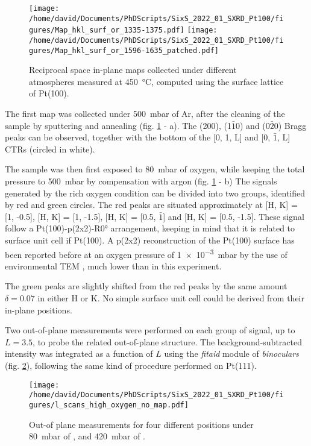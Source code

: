 \begin{figure}[!htb]
    \centering
    \texttt{[image: /home/david/Documents/PhDScripts/SixS\_2022\_01\_SXRD\_Pt100/figures/Map\_hkl\_surf\_or\_1335-1375.pdf]}
    \texttt{[image: /home/david/Documents/PhDScripts/SixS\_2022\_01\_SXRD\_Pt100/figures/Map\_hkl\_surf\_or\_1596-1635\_patched.pdf]}
    \caption{
        Reciprocal space in-plane maps collected under different atmospheres measured at \qty{450}{\degreeCelsius}, computed using the surface lattice of Pt(100).
    }
    \label{fig:MapsPt100A}
\end{figure}

The first map was collected under \qty{500}{\milli\bar} of Ar, after the cleaning of the sample by sputtering and annealing (fig. \ref{fig:MapsPt100A} - a).
The (200), (1$\bar{1}$0) and (0$\bar{2}$0) Bragg peaks can be observed, together with the bottom of the [0, 1, L] and [0, $\bar{1}$, L] CTRs (circled in white).

The sample was then first exposed to \qty{80}{\milli\bar} of oxygen, while keeping the total pressure to \qty{500}{\milli\bar} by compensation with argon (fig. \ref{fig:MapsPt100A} - b)
The signals generated by the rich oxygen condition can be divided into two groups, identified by red and green circles.
The red peaks are situated approximately at [H, K] = [1, -0.5], [H, K] = [1, -1.5], [H, K] = [0.5, $\bar{1}$] and [H, K] = [0.5, -1.5].
These signal follow a Pt(100)-p(2x2)-R\ang{0} arrangement, keeping in mind that it is related to surface unit cell if Pt(100).
A p(2x2) reconstruction of the Pt(100) surface has been reported before at an oxygen pressure of \qty{1e-3}{\milli\bar} by the use of environmental TEM \parencite{Li2016}, much lower than in this experiment.

The green peaks are slightly shifted from the red peaks by the same amount $\delta = 0.07$ in either H or K.
No simple surface unit cell could be derived from their in-plane positions.

Two out-of-plane measurements were performed on each group of signal, up to $L=3.5$, to probe the related out-of-plane structure.
The background-subtracted intensity was integrated as a function of $L$ using the \textit{fitaid} module of \textit{binoculars} (fig. \ref{fig:LScansHighOxygenPt100}), following the same kind of procedure performed on Pt(111).

\begin{figure}[!htb]
    \centering
    \texttt{[image: /home/david/Documents/PhDScripts/SixS\_2022\_01\_SXRD\_Pt100/figures/l\_scans\_high\_oxygen\_no\_map.pdf]}
    \caption{
        Out-of plane measurements for four different positions under \qty{80}{\milli\bar} of , and \qty{420}{\milli\bar} of .
    }
    \label{fig:LScansHighOxygenPt100}
\end{figure}

